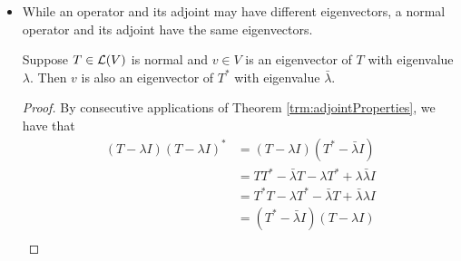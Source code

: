\documentclass[../main.tex]{subfiles}
\begin{document}
\begin{itemize}
\begin{theorem}
\begin{proof}
            \begin{align*}
                \inp{T^*Tv}{v} &= \inp{TT^*v}{v}\\
                \inp{Tv}{Tv} &= \inp{T^*v}{T^*v}\\
                \norm{Tv}^2 &= \norm{T^*v}^2\\
                \norm{Tv} &= \norm{T^*v}
            \end{align*}
            for all $v\in V$, as desired.\par
            Now suppose that $\norm{Tv}=\norm{T^*v}$ for all $v\in V$. Then following the reverse of the procedure for the forward direction, we can easily show that $\inp{(T^*T-TT^*)v}{v}=0$ for all $v\in V$. Additionally, by consecutive applications of Theorem \ref{trm:adjointProperties}, we have that
            \begin{align*}
                (T^*T-TT^*)^* &= (T^*T)^*-(TT^*)^*\\
                &= T^*(T^*)^*-(T^*)^*T^*\\
                &= T^*T-TT^*
            \end{align*}
            It follows that $T^*T-TT^*$ is self-adjoint. This combined with the previous result implies by Theorem \ref{trm:selfAdjointTvv} that $T^*T-TT^*=0$. It follows that $T^*T=TT^*$, so $T$ is normal, as desired.
        \end{proof}
    \end{theorem}
    \item While an operator and its adjoint may have different eigenvectors, a normal operator and its adjoint have the same eigenvectors.
    \begin{theorem}\label{trm:normalSameEigenvectors}
        Suppose $T\in\mathcal{L}(V)$ is normal and $v\in V$ is an eigenvector of $T$ with eigenvalue $\lambda$. Then $v$ is also an eigenvector of $T^*$ with eigenvalue $\bar{\lambda}$.
        \begin{proof}
            By consecutive applications of Theorem \ref{trm:adjointProperties}, we have that
            \begin{align*}
                (T-\lambda I)(T-\lambda I)^* &= (T-\lambda I)(T^*-\bar{\lambda}I)\\
                &= TT^*-\bar{\lambda}T-\lambda T^*+\lambda\bar{\lambda}I\\
                &= T^*T-\lambda T^*-\bar{\lambda}T+\bar{\lambda}\lambda I\\
                &= (T^*-\bar{\lambda}I)(T-\lambda I)\\

\end{align*}
\end{proof}
\end{theorem}
\end{itemize}
\end{document}
